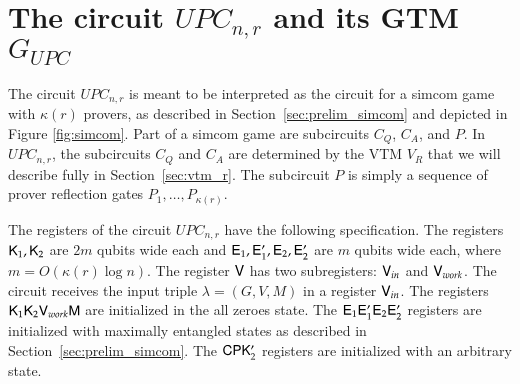 
\section{The circuit $UPC_{n,r}$ and its GTM $G_{UPC}$}
\label{sec:upc}

The circuit $UPC_{n,r}$ is meant to be interpreted as the circuit for a simcom game with $\kappa(r)$ provers, as described in Section~\ref{sec:prelim_simcom} and depicted in Figure \ref{fig:simcom}. Part of a simcom game are subcircuits $C_Q$, $C_A$, and $P$. In $UPC_{n,r}$, the subcircuits $C_Q$ and $C_A$ are determined by the VTM $V_R$ that we will describe fully in Section~\ref{sec:vtm_r}. The subcircuit $P$ is simply a sequence of prover reflection gates $P_1,\ldots,P_{\kappa(r)}$. %

The registers of the circuit $UPC_{n,r}$ have the following specification. The registers ${\mathsf{K}}_1, {\mathsf{K}}_2$ are $2m$ qubits wide each and ${\mathsf{E}}_1,{\mathsf{E}}_1',{\mathsf{E}}_2,{\mathsf{E}}_2'$ are $m$ qubits wide each, where $m = O(\kappa(r) \log n)$. The register ${\mathsf{V}}$ has two subregisters: ${\mathsf{V}}_{in}$ and ${\mathsf{V}}_{work}$. The circuit receives the input triple $\lambda = (G,V,M)$ in a register ${\mathsf{V}}_{in}$. The registers ${\mathsf{K}}_1 {\mathsf{K}}_2 {\mathsf{V}}_{work} {\mathsf{M}}$ are initialized in the all zeroes state. The ${\mathsf{E}}_1 {\mathsf{E}}_1' {\mathsf{E}}_2 {\mathsf{E}}_2'$ registers are initialized with maximally entangled states as described in Section~\ref{sec:prelim_simcom}. The ${\mathsf{C}} {\mathsf{P}} {\mathsf{K}}_2'$ registers are initialized with an arbitrary state.




